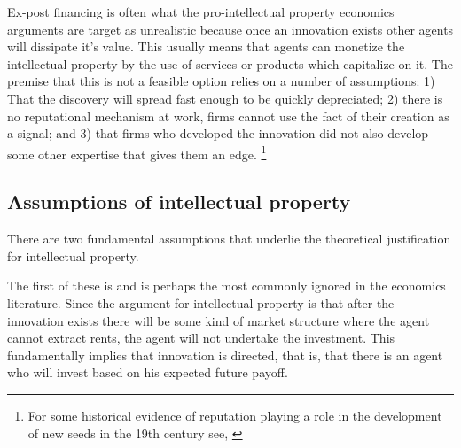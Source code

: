
Ex-post financing is often what the pro-intellectual property economics arguments are target as unrealistic because once an innovation exists other agents will dissipate it's value. This usually means that agents can monetize the intellectual property by the use of services or products which capitalize on it. The premise that this is not a feasible option relies on a number of assumptions: 1) That the discovery will spread fast enough to be quickly depreciated; 2) there is no reputational mechanism at work, firms cannot use the fact of their creation as a signal; and 3) that firms who developed the innovation did not also develop some other expertise that gives them an edge. \footnote{For some historical evidence of reputation playing a role in the development of new seeds in the 19th century see, \cite{charnley2013seeds}}






\subsection{Assumptions of intellectual property}


There are two fundamental assumptions that underlie the theoretical justification for intellectual property. 

The first of these is  and is perhaps the most commonly ignored in the economics literature. Since the argument for intellectual property is that after the innovation exists there will be some kind of market structure where the agent cannot extract rents, the agent will not undertake the investment. This fundamentally implies that innovation is directed, that is, that there is an agent who will invest based on his expected future payoff.

